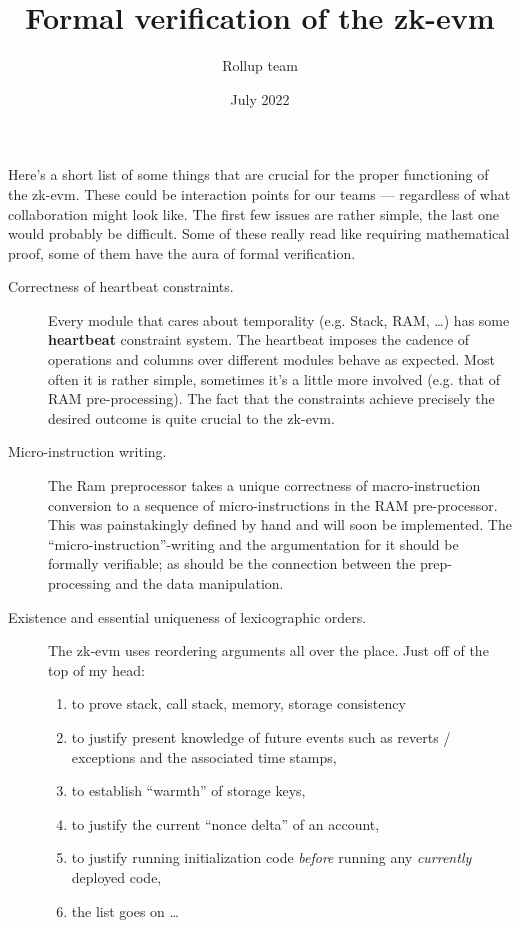 \documentclass{article}
\title{Formal verification of the zk-evm}
\author{Rollup team}
\date{July 2022}
\begin{document}
\maketitle
\tableofcontents

Here's a short list of some things that are crucial for the proper functioning of the zk-evm. These could be interaction points for our teams --- regardless of what collaboration might look like. The first few issues are rather simple, the last one would probably be difficult. Some of these really read like requiring mathematical proof, some of them have the aura of formal verification.
\begin{description}
	\item[Correctness of heartbeat constraints.] Every module that cares about temporality (e.g. Stack, RAM, \dots{}) has some \textbf{heartbeat} constraint system. The heartbeat imposes the cadence of operations and columns over different modules behave as expected. Most often it is rather simple, sometimes it's a little more involved (e.g. that of RAM pre-processing). The fact that the constraints achieve precisely the desired outcome is quite crucial to the zk-evm.
	\item[Micro-instruction writing.] The Ram preprocessor takes a unique correctness of macro-instruction conversion to a sequence of micro-instructions in the RAM pre-processor. This was painstakingly defined by hand and will soon be implemented. The ``micro-instruction''-writing and the argumentation for it should be formally verifiable; as should be the connection between the prep-processing and the data manipulation. 
	\item[Existence and essential uniqueness of lexicographic orders.] The zk-evm uses reordering arguments all over the place. Just off of the top of my head:
	\begin{enumerate}
		\item to prove stack, call stack, memory, storage consistency
		\item to justify present knowledge of future events such as reverts / exceptions and the associated time stamps,
		\item to establish ``warmth'' of storage keys,
		\item to justify the current ``nonce delta'' of an account,
		\item to justify running initialization code \emph{before} running any \emph{currently} deployed code,
		\item the list goes on \dots{}
	\end{enumerate}

\end{description}
\end{document}

